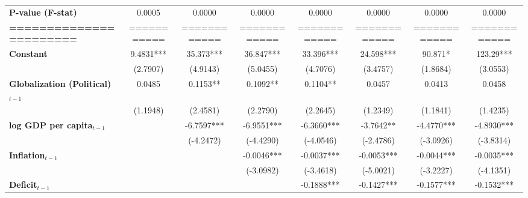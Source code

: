 \begin{center}
\begin{tabular}{lccccccc}
\textbf{P-value (F-stat)}          &       0.0005      &        0.0000        &           0.0000          &       0.0000       &      0.0000     &           0.0000          &            0.0000             \\
\textbf{=======================}   &    ===========    &     ============     &        ============       &    ============    &   ============  &        ============       &         ============          \\
\textbf{Constant}                     &     9.4831***     &      35.373***       &         36.847***         &     33.396***      &    24.598***    &          90.871*          &          123.29***            \\
\textbf{ }                         &      (2.7907)     &       (4.9143)       &          (5.0455)         &      (4.7076)      &     (3.4757)    &          (1.8684)         &           (3.0553)            \\
\textbf{Globalization (Political)$_{t-1}$}             &       0.0485      &       0.1153**       &          0.1092**         &      0.1104**      &      0.0457     &           0.0413          &            0.0458             \\
\textbf{ }                         &      (1.1948)     &       (2.4581)       &          (2.2790)         &      (2.2645)      &     (1.2349)    &          (1.1841)         &           (1.4235)            \\
\textbf{log GDP per capita$_{t-1}$}           &                   &      -6.7597***      &         -6.9551***        &     -6.3660***     &    -3.7642**    &         -4.4770***        &          -4.8930***           \\
\textbf{ }                         &                   &      (-4.2472)       &         (-4.4290)         &     (-4.0546)      &    (-2.4786)    &         (-3.0926)         &          (-3.8314)            \\
\textbf{Inflation$_{t-1}$}      &                   &                      &         -0.0046***        &     -0.0037***     &    -0.0053***   &         -0.0044***        &          -0.0035***           \\
\textbf{ }                         &                   &                      &         (-3.0982)         &     (-3.4618)      &    (-5.0021)    &         (-3.2227)         &          (-4.1351)            \\
\textbf{Deficit$_{t-1}$}             &                   &                      &                           &     -0.1888***     &    -0.1427***   &         -0.1577***        &          -0.1532***           \\

\end{tabular}
\end{center}
